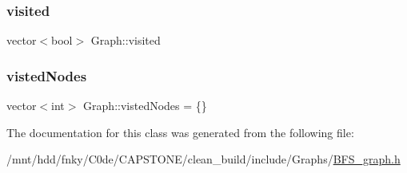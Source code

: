 \subsubsection{\texorpdfstring{visited}{visited}}
{\footnotesize\ttfamily vector$<$bool$>$ Graph\+::visited\hspace{0.3cm}{\ttfamily [private]}}

\mbox{\label{classGraph_a51d47fdc341faa7db5e4191ee29854cf}} 
\subsubsection{\texorpdfstring{visted\+Nodes}{vistedNodes}}
{\footnotesize\ttfamily vector$<$int$>$ Graph\+::visted\+Nodes = \{\}\hspace{0.3cm}{\ttfamily [private]}}



The documentation for this class was generated from the following file\+:\begin{DoxyCompactItemize}
\item 
/mnt/hdd/fnky/\+C0de/\+C\+A\+P\+S\+T\+O\+N\+E/clean\+\_\+build/include/\+Graphs/\hyperlink{BFS__graph_8h}{B\+F\+S\+\_\+graph.\+h}\end{DoxyCompactItemize}
